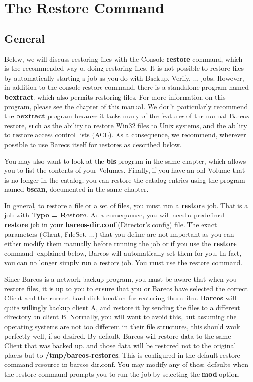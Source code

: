\chapter{The Restore Command}
\label{RestoreChapter}

\section{General}

Below, we will discuss restoring files with the Console {\bf restore} command,
which is the recommended way of doing restoring files. It is not possible
to restore files by automatically starting a job as you do with Backup,
Verify, ... jobs.  However, in addition to the console restore command,
there is a standalone program named {\bf bextract}, which also permits
restoring files.  For more information on this program, please see the
 chapter of this manual. We
don't particularly recommend the {\bf bextract} program because it
lacks many of the features of the normal Bareos restore, such as the
ability to restore Win32 files to Unix systems, and the ability to
restore access control lists (ACL).  As a consequence, we recommend,
wherever possible to use Bareos itself for restores as described below.

You may also want to look at the {\bf bls} program in the same chapter,
which allows you to list the contents of your Volumes.  Finally, if you
have an old Volume that is no longer in the catalog, you can restore the
catalog entries using the program named {\bf bscan}, documented in the same
 chapter.

In general, to restore a file or a set of files, you must run a {\bf restore}
job. That is a job with {\bf Type = Restore}. As a consequence, you will need
a predefined {\bf restore} job in your {\bf bareos-dir.conf} (Director's
config) file. The exact parameters (Client, FileSet, ...) that you define are
not important as you can either modify them manually before running the job or
if you use the {\bf restore} command, explained below, Bareos will
automatically set them for you. In fact, you can no longer simply run a restore
job.  You must use the restore command.

Since Bareos is a network backup program, you must be aware that when you
restore files, it is up to you to ensure that you or Bareos have selected the
correct Client and the correct hard disk location for restoring those files.
{\bf Bareos} will quite willingly backup client A, and restore it by sending
the files to a different directory on client B. Normally, you will want to
avoid this, but assuming the operating systems are not too different in their
file structures, this should work perfectly well, if so desired.
By default, Bareos will restore data to the same Client that was backed
up, and those data will be restored not to the original places but to
{\bf /tmp/bareos-restores}. This is configured in the default restore
command resource in bareos-dir.conf.  You may modify any of these defaults when the
restore command prompts you to run the job by selecting the {\bf mod}
option.

